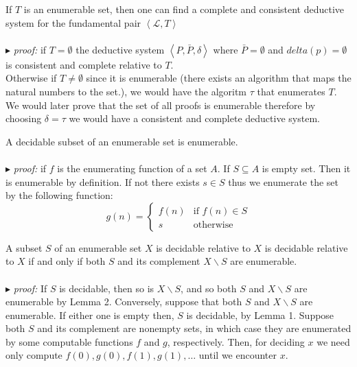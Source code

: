 \documentclass[10pt,a4paper]{article}
\newcounter{theo}
\newcommand{\curveL}{\mathcal{L}}
\newcommand{\proof}{\\ \ \\ $\blacktriangleright$ \textit{proof: }}
\begin{document}
                        \begin{theorem}
                            If $T$ is an enumerable set, then one can find a complete and consistent deductive system for the fundamental pair $\left<\curveL, T\right>$
                            \proof if $T=\emptyset$ the deductive system $\left<P, \bar P, \delta\right>$ where $\bar P = \emptyset$ and $delta(p)=\emptyset$ is consistent and complete relative to $T$.
                            \\
                            Otherwise if $T \not = \emptyset$ since it is enumerable (there exists an algorithm that maps the natural numbers to the set.), we would have the algoritm $\tau$ that enumerates $T$. We would later prove that the set of all proofs is enumerable therefore by choosing $\delta = \tau$ we would have a consistent and complete deductive system.
                        \end{theorem}
                        \begin{lemma}
                            A decidable subset of an enumerable set is enumerable.
                            \proof if $f$ is the enumerating function of a set $A$. If $S\subseteq A$ is empty set. Then it is enumerable by definition. If not there exists $s\in S$ thus we enumerate the set by the following function:
                            \begin{equation}
                                g(n)=\left\{\begin{matrix}
                                    f(n) & \text{if } f(n) \in S\\
                                    s & \text{otherwise}\end{matrix}\right.
                            \end{equation}
                        \end{lemma}
                        \begin{lemma}
                            A subset $S$ of an enumerable set $X$ is decidable relative to $X$ is decidable relative to $X$ if and only if both $S$ and its complement $X\backslash S$ are enumerable.
                            \proof If $S$ is decidable, then so is $X\backslash S$, and so both $S$ and $X\backslash S$ are enumerable by Lemma 2. Conversely, suppose that both $S$ and $X\backslash S$ are enumerable. If either one is empty then, $S$ is decidable, by Lemma 1. Suppose both $S$ and its complement are nonempty sets, in which case they are enumerated by some computable functions $f$ and $g$, respectively. Then, for deciding $x$ we need only compute $f(0),g(0),f(1),g(1),\dots$ until we encounter $x$.
                        \end{lemma}
\end{document}
